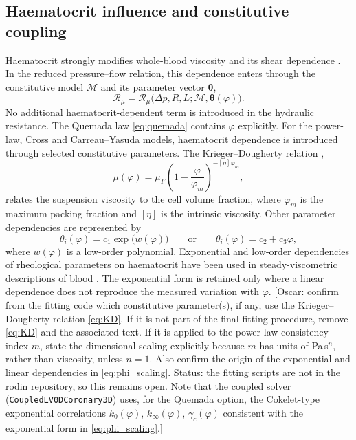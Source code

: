 \documentclass[lineno]{jfm}
\begin{document}
\subsection{Haematocrit influence and constitutive coupling}
\label{sec:haematocrit}
Haematocrit strongly modifies whole-blood viscosity and its shear dependence
\citep{Mozos2015,Nader2019,Isbister1994}. In the reduced pressure--flow
relation, this dependence enters through the constitutive model
$\mathcal{M}$ and its parameter vector $\boldsymbol{\theta}$,
\begin{equation}
\mathcal{R}_{\mu}
=
\mathcal{R}_{\mu}
\bigl(
\Delta p,R,L;
\mathcal{M},\boldsymbol{\theta}(\varphi)
\bigr).
\label{eq:Rmu_phi}
\end{equation}
No additional haematocrit-dependent term is introduced in the hydraulic
resistance.
The Quemada law \eqref{eq:quemada} contains $\varphi$ explicitly. For the
power-law, Cross and Carreau--Yasuda models, haematocrit dependence is
introduced through selected constitutive parameters. The
Krieger--Dougherty relation \citep{Krieger1959},
\begin{equation}
\mu(\varphi)
=
\mu_F
\left(
1-\frac{\varphi}{\varphi_m}
\right)^{-[\eta]\varphi_m},
\label{eq:KD}
\end{equation}
relates the suspension viscosity to the cell volume fraction, where
$\varphi_m$ is the maximum packing fraction and $[\eta]$ is the intrinsic
viscosity. Other parameter dependencies are represented by
\begin{equation}
\theta_i(\varphi)
=
c_1\exp\bigl(w(\varphi)\bigr)
\qquad\text{or}\qquad
\theta_i(\varphi)
=
c_2+c_3\varphi ,
\label{eq:phi_scaling}
\end{equation}
where $w(\varphi)$ is a low-order polynomial. Exponential and low-order
dependencies of rheological parameters on haematocrit have been used in
steady-viscometric descriptions of blood
\citep{CokeletA1963,CokeletB1963}. The exponential form is retained only where
a linear dependence does not reproduce the measured variation with
$\varphi$.
{\color{red}[Oscar: confirm from the fitting code which constitutive
parameter(s), if any, use the Krieger--Dougherty relation
\eqref{eq:KD}. If it is not part of the final fitting procedure, remove
\eqref{eq:KD} and the associated text. If it is applied to the power-law
consistency index $m$, state the dimensional scaling explicitly because
$m$ has units of Pa\,s$^n$, rather than viscosity, unless $n=1$. Also confirm
the origin of the exponential and linear dependencies in
\eqref{eq:phi_scaling}.
{\color{blue}Status: the fitting scripts are not in the rodin repository, so
this remains open. Note that the coupled solver
(\texttt{CoupledLV0DCoronary3D}) uses, for the Quemada option, the
Cokelet-type exponential correlations
$k_0(\varphi)$, $k_\infty(\varphi)$, $\dot\gamma_c(\varphi)$
consistent with the exponential form in \eqref{eq:phi_scaling}.}]}
\end{document}
